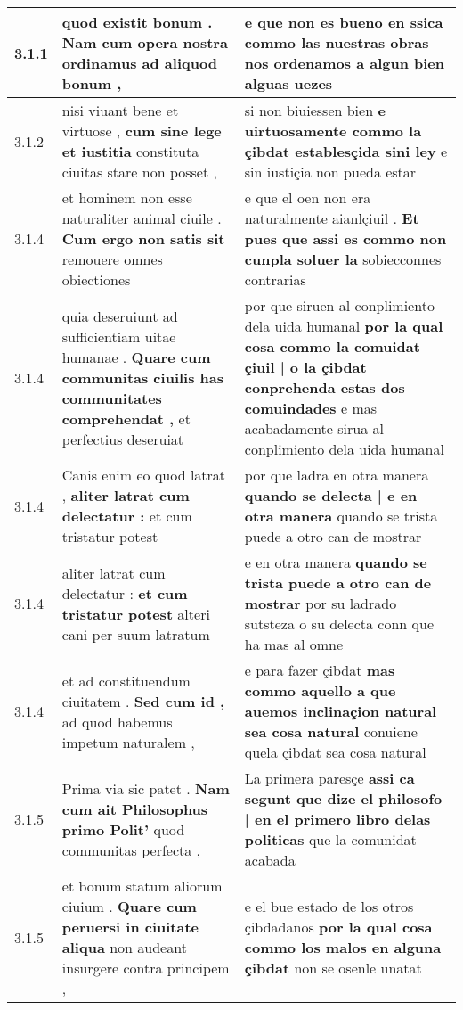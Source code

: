 \begin{tabular}{|p{1cm}|p{6.5cm}|p{6.5cm}|}
3.1.1 & quod existit bonum . \textbf{ Nam cum opera nostra ordinamus } ad aliquod bonum , & e que non es bueno en ssica \textbf{ commo las nuestras obras nos ordenamos } a algun bien alguas uezes \\\hline
3.1.2 & nisi viuant bene et virtuose , \textbf{ cum sine lege et iustitia } constituta ciuitas stare non posset , & si non biuiessen bien \textbf{ e uirtuosamente commo la çibdat establesçida sini ley } e sin iustiçia non pueda estar \\\hline
3.1.4 & et hominem non esse naturaliter animal ciuile . \textbf{ Cum ergo non satis sit } remouere omnes obiectiones & e que el oen non era naturalmente aianlçiuil . \textbf{ Et pues que assi es commo non cunpla soluer la } sobiecconnes contrarias \\\hline
3.1.4 & quia deseruiunt ad sufficientiam uitae humanae . \textbf{ Quare cum communitas ciuilis has communitates comprehendat , } et perfectius deseruiat & por que siruen al conplimiento dela uida humanal \textbf{ por la qual cosa commo la comuidat çiuil | o la çibdat conprehenda estas dos comuindades } e mas acabadamente sirua al conplimiento dela uida humanal \\\hline
3.1.4 & Canis enim eo quod latrat , \textbf{ aliter latrat cum delectatur : } et cum tristatur potest & por que ladra en otra manera \textbf{ quando se delecta | e en otra manera } quando se trista puede a otro can de mostrar \\\hline
3.1.4 & aliter latrat cum delectatur : \textbf{ et cum tristatur potest } alteri cani per suum latratum & e en otra manera \textbf{ quando se trista puede a otro can de mostrar } por su ladrado sutsteza o su delecta conn que ha mas al omne \\\hline
3.1.4 & et ad constituendum ciuitatem . \textbf{ Sed cum id , } ad quod habemus impetum naturalem , & e para fazer çibdat \textbf{ mas commo aquello a que auemos inclinaçion natural sea cosa natural } conuiene quela çibdat sea cosa natural \\\hline
3.1.5 & Prima via sic patet . \textbf{ Nam cum ait Philosophus primo Polit’ } quod communitas perfecta , & La primera paresçe \textbf{ assi ca segunt que dize el philosofo | en el primero libro delas politicas } que la comunidat acabada \\\hline
3.1.5 & et bonum statum aliorum ciuium . \textbf{ Quare cum peruersi in ciuitate aliqua } non audeant insurgere contra principem , & e el bue estado de los otros çibdadanos \textbf{ por la qual cosa commo los malos en alguna çibdat } non se osenle unatat \\\hline

\end{tabular}
